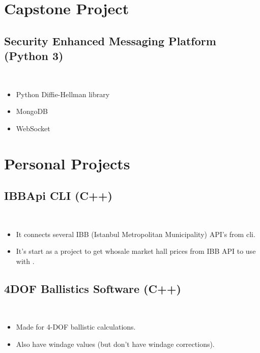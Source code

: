 \documentclass[a4paper, 9pt]{extarticle}
\begin{document}
\maketitle{}
\myeducation{}
\myexperience{}

\section{Capstone Project}

\subsection{Security Enhanced Messaging Platform (Python 3)} \hfill \\
\begin{itemize}
	\item Python Diffie-Hellman library
	\item MongoDB
	\item WebSocket
\end{itemize}

\section{Personal Projects}

\subsection{IBBApi CLI (C++)} \hfill \\
\begin{itemize}
	\item It connects several IBB (Istanbul Metropolitan Municipality) API's from cli.
	\item It's start as a project to get whosale market hall prices from IBB API to use
		with .
\end{itemize}

\subsection{4DOF Ballistics Software (C++)} \hfill \\
\begin{itemize}
	\item Made for 4-DOF ballistic calculations.
	\item Also have windage values (but don't have windage corrections).
\end{itemize}
\end{document}
